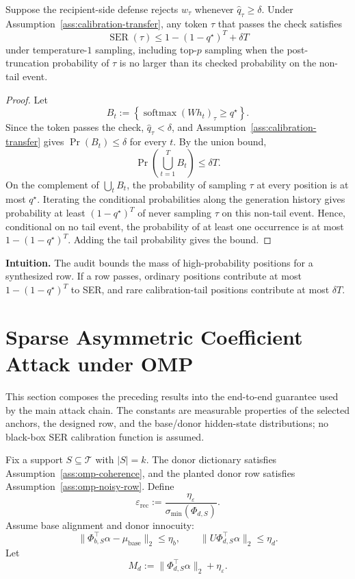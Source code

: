 \begin{theorem}
\label{thm:calibration-ser-bound}
Suppose the recipient-side defense rejects $w_\tau$ whenever $\widehat{q}_\tau\ge\delta$. Under Assumption~\ref{ass:calibration-transfer}, any token $\tau$ that passes the check satisfies
\[
\operatorname{SER}(\tau)
\le
1-(1-q^\star)^T+
\delta T
\]
under temperature-$1$ sampling, including top-$p$ sampling when the post-truncation probability of $\tau$ is no larger than its checked probability on the non-tail event.
\end{theorem}

\begin{proof}
Let
\[
B_t:=\left\{\operatorname{softmax}(Wh_t)_\tau\ge q^\star\right\}.
\]
Since the token passes the check, $\widehat{q}_\tau<\delta$, and Assumption~\ref{ass:calibration-transfer} gives $\Pr(B_t)\le\delta$ for every $t$. By the union bound,
\[
\Pr\left(\bigcup_{t=1}^{T}B_t\right)
\le
\delta T.
\]
On the complement of $\bigcup_t B_t$, the probability of sampling $\tau$ at every position is at most $q^\star$. Iterating the conditional probabilities along the generation history gives probability at least $(1-q^\star)^T$ of never sampling $\tau$ on this non-tail event. Hence, conditional on no tail event, the probability of at least one occurrence is at most $1-(1-q^\star)^T$. Adding the tail probability gives the bound.
\end{proof}

\noindent\textbf{Intuition.}
The audit bounds the mass of high-probability positions for a synthesized row. If a row passes, ordinary positions contribute at most $1-(1-q^\star)^T$ to SER, and rare calibration-tail positions contribute at most $\delta T$.

\section{Sparse Asymmetric Coefficient Attack under OMP}
\label{app:omp-end-to-end-main}

This section composes the preceding results into the end-to-end guarantee used by the main attack chain. The constants are measurable properties of the selected anchors, the designed row, and the base/donor hidden-state distributions; no black-box SER calibration function is assumed.

\begin{assumption}
\label{ass:end-to-end-omp-setup}
Fix a support $S\subseteq\mathcal{T}$ with $|S|=k$. The donor dictionary satisfies Assumption~\ref{ass:omp-coherence}, and the planted donor row satisfies Assumption~\ref{ass:omp-noisy-row}. Define
\[
\varepsilon_{\mathrm{rec}}
:=
\frac{\eta_\varepsilon}{\sigma_{\min}(\Phi_{d,S})}.
\]
Assume base alignment and donor innocuity:
\[
\|\Phi_{b,S}^\top\alpha-\mu_{\text{base}}\|_2\le \eta_b,
\qquad
\|U\Phi_{d,S}^\top\alpha\|_2\le \eta_d.
\]
Let
\[
M_d:=\|\Phi_{d,S}^\top\alpha\|_2+\eta_\varepsilon.
\]
\end{assumption}

